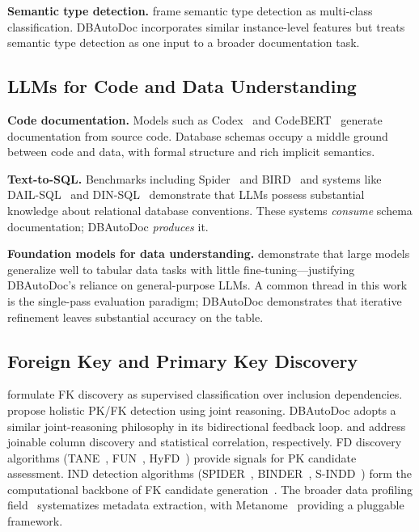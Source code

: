\documentclass[twocolumn]{svjour3}
\begin{document}
\textbf{Semantic type detection.} \cite{hulsebos2019sherlock} frame semantic type detection as multi-class classification. DBAutoDoc incorporates similar instance-level features but treats semantic type detection as one input to a broader documentation task.

\subsection{LLMs for Code and Data Understanding}

\textbf{Code documentation.} Models such as Codex~\cite{chen2021evaluating} and CodeBERT~\cite{feng2020codebert} generate documentation from source code. Database schemas occupy a middle ground between code and data, with formal structure and rich implicit semantics.

\textbf{Text-to-SQL.} Benchmarks including Spider~\cite{yu2018spider} and BIRD~\cite{li2023bird} and systems like DAIL-SQL~\cite{gao2024dailsql} and DIN-SQL~\cite{pourreza2023dinsql} demonstrate that LLMs possess substantial knowledge about relational database conventions. These systems \emph{consume} schema documentation; DBAutoDoc \emph{produces} it.

\textbf{Foundation models for data understanding.} \cite{narayan2022foundation} demonstrate that large models generalize well to tabular data tasks with little fine-tuning---justifying DBAutoDoc's reliance on general-purpose LLMs. A common thread in this work is the single-pass evaluation paradigm; DBAutoDoc demonstrates that iterative refinement leaves substantial accuracy on the table.

\subsection{Foreign Key and Primary Key Discovery}

\cite{rostin2009fk} formulate FK discovery as supervised classification over inclusion dependencies. \cite{jiang2020holistic} propose holistic PK/FK detection using joint reasoning. DBAutoDoc adopts a similar joint-reasoning philosophy in its bidirectional feedback loop. \cite{khatiwada2022alite} and \cite{ilyas2004cords} address joinable column discovery and statistical correlation, respectively. FD discovery algorithms (TANE~\cite{huhtala1999tane}, FUN~\cite{novelli2001fun}, HyFD~\cite{papenbrock2016hyfd}) provide signals for PK candidate assessment. IND detection algorithms (SPIDER~\cite{bauckmann2007spider}, BINDER~\cite{papenbrock2015binder}, S-INDD~\cite{demarchi2009sindd}) form the computational backbone of FK candidate generation~\cite{dursch2019ind}. The broader data profiling field~\cite{abedjan2018book,abedjan2015profiling,naumann2013revisited} systematizes metadata extraction, with Metanome~\cite{papenbrock2015metanome} providing a pluggable framework.
\end{document}
